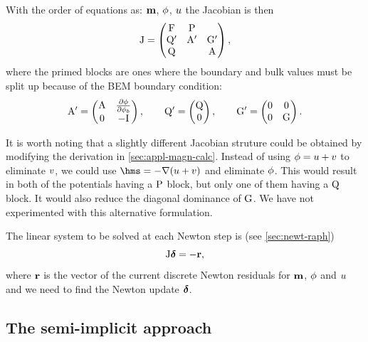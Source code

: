 With the order of equations as: $\boldsymbol{\mathrm{m}}$, $\phi$, $u$ the Jacobian is then
\begin{equation}
  \mathrm{J} =
  \begin{pmatrix}
    \mathrm{F}       & \mathrm{P}     &  \\
    \mathrm{Q}'      & \mathrm{A}' &  {\mathbf{\mathrm{G}}}'  \\
    \mathrm{Q}       &         &   \mathrm{A}
  \end{pmatrix},
  \label{eq:16}
\end{equation}
where the primed blocks are ones where the boundary and bulk values must be split up because of the BEM boundary condition:
\begin{equation}
  \mathrm{A}' =
  \begin{pmatrix}
    \mathrm{A}     & \frac{\partial \phi}{\partial \phi_b} \\
    0      & -\mathrm{I}
  \end{pmatrix},
  \qquad
  \mathrm{Q}' =
  \begin{pmatrix}
    \mathrm{Q} \\
    0
  \end{pmatrix},
  \qquad
  {\mathbf{\mathrm{G}}}' =
  \begin{pmatrix}
    0  & 0 \\
    0  & {\mathbf{\mathrm{G}}}
  \end{pmatrix}.
\end{equation}


It is worth noting that a slightly different Jacobian struture could be obtained by modifying the derivation in \cref{sec:appl-magn-calc}.
Instead of using $\phi = u + v$ to eliminate $v$, we could use $\hms = - \grad ( \phione + \phitwo)$ and eliminate $\phi$.
This would result in both of the potentials having a $\mathrm{P}$ block, but only one of them having a $\mathrm{Q}$ block.
It would also reduce the diagonal dominance of ${\mathbf{\mathrm{G}}}$.
We have not experimented with this alternative formulation.

The linear system to be solved at each Newton step is (see \cref{sec:newt-raph})
\begin{equation}
  \mathrm{J} \boldsymbol{\mathrm{\delta}} = -\boldsymbol{\mathrm{r}},
  \label{eq:87}
\end{equation}
where $\boldsymbol{\mathrm{r}}$ is the vector of the current discrete Newton residuals for $\boldsymbol{\mathrm{m}}$, $\phi$ and $u$ and we need to find the Newton update $\boldsymbol{\mathrm{\delta}}$.


\subsection{The semi-implicit approach}
\label{sec:semi-implicit-bem}

